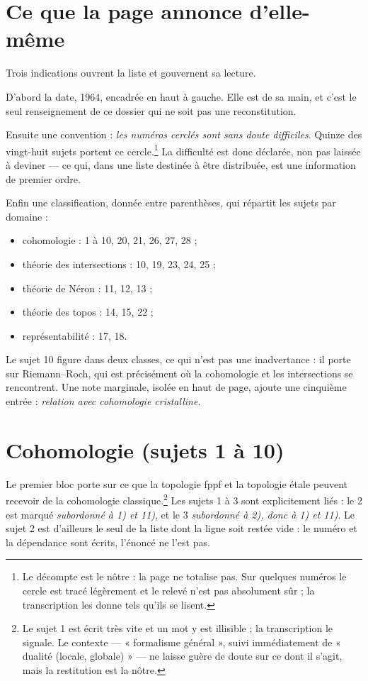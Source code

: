 \documentclass[11pt,a4paper]{article}
\begin{document}
\section*{Ce que la page annonce d'elle-même}

Trois indications ouvrent la liste et gouvernent sa lecture.

D'abord la date, 1964, encadrée en haut à gauche. Elle est de sa main, et c'est
le seul renseignement de ce dossier qui ne soit pas une reconstitution.

Ensuite une convention : \emph{les numéros cerclés sont sans doute difficiles}.
Quinze des vingt-huit sujets portent ce cercle.\footnote{Le décompte est le
nôtre : la page ne totalise pas. Sur quelques numéros le cercle est tracé
légèrement et le relevé n'est pas absolument sûr ; la transcription les donne
tels qu'ils se lisent.} La difficulté est donc déclarée, non pas laissée à
deviner --- ce qui, dans une liste destinée à être distribuée, est une
information de premier ordre.

Enfin une classification, donnée entre parenthèses, qui répartit les sujets par
domaine :

\begin{itemize}
\item cohomologie : 1 à 10, 20, 21, 26, 27, 28 ;
\item théorie des intersections : 10, 19, 23, 24, 25 ;
\item théorie de Néron : 11, 12, 13 ;
\item théorie des topos : 14, 15, 22 ;
\item représentabilité : 17, 18.
\end{itemize}

Le sujet 10 figure dans deux classes, ce qui n'est pas une inadvertance : il
porte sur Riemann--Roch, qui est précisément où la cohomologie et les
intersections se rencontrent. Une note marginale, isolée en haut de page,
ajoute une cinquième entrée : \emph{relation avec cohomologie cristalline}.

\section*{Cohomologie (sujets 1 à 10)}

Le premier bloc porte sur ce que la topologie fppf et la topologie étale
peuvent recevoir de la cohomologie classique.\footnote{Le sujet 1 est écrit très
vite et un mot y est illisible ; la transcription le signale. Le contexte ---
« formalisme général », suivi immédiatement de « dualité (locale, globale) » ---
ne laisse guère de doute sur ce dont il s'agit, mais la restitution est la
nôtre.} Les sujets 1 à 3 sont explicitement liés : le 2 est marqué
\emph{subordonné à 1) et 11)}, et le 3 \emph{subordonné à 2), donc à 1) et 11)}.
Le sujet 2 est d'ailleurs le seul de la liste dont la ligne soit restée vide :
le numéro et la dépendance sont écrits, l'énoncé ne l'est pas.
\end{document}
